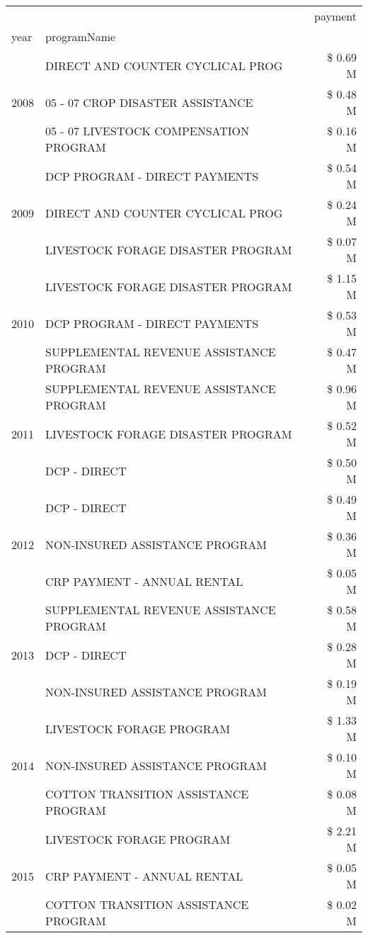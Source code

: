 \begin{tabular}{llr}
\toprule
 &  & payment \\
year & programName &  \\
\midrule
\multirow[t]{3}{*}{2008} & DIRECT AND COUNTER CYCLICAL PROG & \$ 0.69 M \\
 & 05 - 07 CROP DISASTER ASSISTANCE & \$ 0.48 M \\
 & 05 - 07 LIVESTOCK COMPENSATION PROGRAM & \$ 0.16 M \\
\cline{1-3}
\multirow[t]{3}{*}{2009} & DCP PROGRAM - DIRECT PAYMENTS & \$ 0.54 M \\
 & DIRECT AND COUNTER CYCLICAL PROG & \$ 0.24 M \\
 & LIVESTOCK FORAGE DISASTER  PROGRAM & \$ 0.07 M \\
\cline{1-3}
\multirow[t]{3}{*}{2010} & LIVESTOCK FORAGE DISASTER  PROGRAM & \$ 1.15 M \\
 & DCP PROGRAM - DIRECT PAYMENTS & \$ 0.53 M \\
 & SUPPLEMENTAL REVENUE ASSISTANCE PROGRAM & \$ 0.47 M \\
\cline{1-3}
\multirow[t]{3}{*}{2011} & SUPPLEMENTAL REVENUE ASSISTANCE PROGRAM & \$ 0.96 M \\
 & LIVESTOCK FORAGE DISASTER PROGRAM & \$ 0.52 M \\
 & DCP - DIRECT & \$ 0.50 M \\
\cline{1-3}
\multirow[t]{3}{*}{2012} & DCP - DIRECT & \$ 0.49 M \\
 & NON-INSURED ASSISTANCE PROGRAM & \$ 0.36 M \\
 & CRP PAYMENT - ANNUAL RENTAL & \$ 0.05 M \\
\cline{1-3}
\multirow[t]{3}{*}{2013} & SUPPLEMENTAL REVENUE ASSISTANCE PROGRAM & \$ 0.58 M \\
 & DCP - DIRECT & \$ 0.28 M \\
 & NON-INSURED ASSISTANCE PROGRAM & \$ 0.19 M \\
\cline{1-3}
\multirow[t]{3}{*}{2014} & LIVESTOCK FORAGE PROGRAM & \$ 1.33 M \\
 & NON-INSURED ASSISTANCE PROGRAM & \$ 0.10 M \\
 & COTTON TRANSITION ASSISTANCE PROGRAM & \$ 0.08 M \\
\cline{1-3}
\multirow[t]{3}{*}{2015} & LIVESTOCK FORAGE PROGRAM & \$ 2.21 M \\
 & CRP PAYMENT - ANNUAL RENTAL & \$ 0.05 M \\
 & COTTON TRANSITION ASSISTANCE PROGRAM & \$ 0.02 M \\

\end{tabular}
